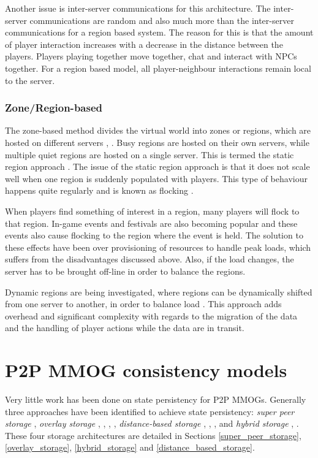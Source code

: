\documentclass[10pt,a4paper,journal,cspaper,compsoc]{IEEEtran}
\begin{document}
Another issue is inter-server communications for this architecture. The inter-server communications are random and also much more than the
inter-server communications for a region based system. The reason for this is that the amount of player interaction increases with a decrease in the
distance between the players. Players playing together move together, chat and interact with \acp{NPC} together. For a region based model, all
player-neighbour interactions remain local to the server.

\subsubsection{Zone/Region-based}
The zone-based method divides the virtual world into zones or regions, which are hosted on different servers \cite{zone_based_stat},
\cite{zone_based_dyn}. Busy regions are hosted on their own servers, while multiple quiet regions are hosted on a single server. This is termed the
static region approach \cite{zone_based_stat}. The issue of the static region approach is that it does not scale well when one region is suddenly
populated with players. This type of behaviour happens quite regularly and is known as flocking \cite{flocking}.

When players find something of interest in a region, many players will flock to that region. In-game events and festivals are also becoming popular
and these events also cause flocking to the region where the event is held. The solution to these effects have been over provisioning of resources to
handle peak loads, which suffers from the disadvantages discussed above. Also, if the load changes, the server has to be brought off-line in order to
balance the regions.

Dynamic regions are being investigated, where regions can be dynamically shifted from one server to another, in order to balance load
\cite{zone_based_dyn}. This approach adds overhead and significant complexity with regards to the migration of the data and the handling of player
actions while the data are in transit.

\section{P2P MMOG consistency models}
\label{p2p_mmog_cm_overview}

Very little work has been done on state persistency for P2P MMOGs. Generally three approaches have been identified to achieve state persistency:
\emph{super peer storage} \cite{knutsson_p2p_first}, \emph{overlay storage} \cite{Douglas05enablingmassively}, \cite{using_freenet_storage},
\cite{Fan_phd}, \cite{past_storage_focus}, \emph{distance-based storage} \cite{Buyukkaya_voronoi_state_management}, \cite{Hu_voronoi_IM},
\cite{colyseus_distance_based}, \cite{AtoZ} and \emph{hybrid storage} \cite{zoned_federation}, \cite{hybrid_storage1}. These four storage
architectures are detailed in Sections \ref{super_peer_storage}, \ref{overlay_storage}, \ref{hybrid_storage} and \ref{distance_based_storage}.
\end{document}
